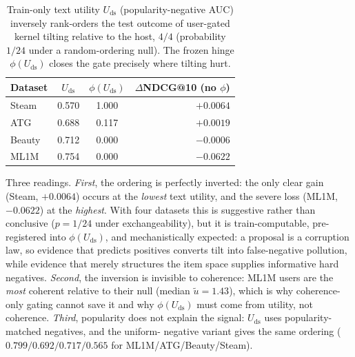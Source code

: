 \documentclass[letterpaper]{article}
\newcommand{\ut}{\tilde{u}}
\newcommand{\Uds}{U_{\mathrm{ds}}}
\newcommand{\phids}{\phi(\Uds)}
\begin{document}
\begin{table}[t]
\centering
\small
\begin{tabular}{lccr}
\toprule
Dataset & $\Uds$ & $\phids$ & $\Delta$NDCG@10 (no $\phi$) \\
\midrule
Steam  & 0.570 & 1.000 & $+0.0064$ \\
ATG    & 0.688 & 0.117 & $+0.0019$ \\
Beauty & 0.712 & 0.000 & $-0.0006$ \\
ML1M   & 0.754 & 0.000 & $-0.0622$ \\
\bottomrule
\end{tabular}
\caption{Train-only text utility $\Uds$ (popularity-negative AUC)
inversely rank-orders the test outcome of user-gated kernel tilting
relative to the host, $4/4$ (probability $1/24$ under a
random-ordering null). The frozen hinge $\phids$ closes the gate
precisely where tilting hurt.}
\label{tab:inversion}
\end{table}

Three readings. \emph{First}, the ordering is perfectly inverted: the
only clear gain (Steam, $+0.0064$) occurs at the \emph{lowest} text
utility, and the severe loss (ML1M, $-0.0622$) at the \emph{highest}.
With four datasets this is suggestive rather than conclusive
($p{=}1/24$ under exchangeability), but it is train-computable,
pre-registered into $\phids$, and mechanistically expected: a proposal
is a corruption law, so evidence that predicts positives converts tilt
into false-negative pollution, while evidence that merely structures
the item space supplies informative hard negatives. \emph{Second}, the
inversion is invisible to coherence: ML1M users are the \emph{most}
coherent relative to their null (median $\ut=1.43$), which is why
coherence-only gating cannot save it and why $\phids$ must come from
utility, not coherence. \emph{Third}, popularity does not explain the
signal: $\Uds$ uses popularity-matched negatives, and the uniform-
negative variant gives the same ordering
($0.799/0.692/0.717/0.565$ for ML1M/ATG/Beauty/Steam).
\end{document}
